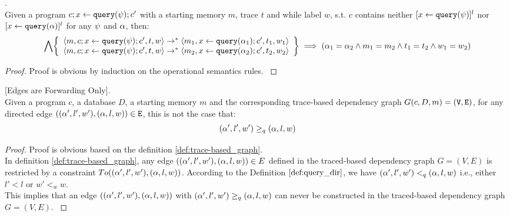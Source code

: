 \documentclass[a4paper,11pt]{article}
\begin{document}
%
%
\begin{lem}
.
\label{lem:querysemidetrm}
\\
{
Given a program $c; \mathrel{ x \leftarrow {\tt query}(\psi) }; c'$ with a starting memory $m$, trace $t$ and while label $w$, 
s.t. $c$ contains neither  
$[\mathrel{ x \leftarrow {\tt query}(\psi) }]^l$ nor $[\mathrel{ x \leftarrow {\tt query}(\alpha) }]^l$ for any $\psi$ and $\alpha$, then:
%
\[
\bigwedge
\left\{
\begin{array}{l}
\config{m, c; \assign{x}{\query(\qexpr)}; c', t, w} 
\rightarrow^{*} 
\config{m_1, \assign{x}{\query(\qval_1)}; c', t_1, w_1} 
\\
\config{m, c; \assign{x}{\query(\qexpr)}; c', t, w} 
\rightarrow^{*} 
\config{m_2, \assign{x}{\query(\qval_2)}; c', t_2, w_2} 
\end{array}
\right\}
\implies
(\qval_1 = \qval_2 \land m_1 = m_2 \land t_1 = t_2 \land w_1 = w_2)
\]
}
\end{lem}
%
\begin{proof}
{
Proof is obvious by induction on the operational semantics rules.
}
\end{proof}
%
\begin{lem}
\label{lem:edgeforwarding}
{[Edges are Forwarding Only]}.
\\
%
{
Given a program $c$, a database $D$, a starting memory $m$ and the corresponding trace-based dependency graph $G(c,D,m) = (\mathtt{V}, \mathtt{E})$, 
for any directed edge $(({\alpha}',l',w'),({\alpha},l,w)) \in \mathtt{E}$, 
this is not the case that:
%
$$({\alpha}',l',w') \geq_{q} ({\alpha},l,w)$$
%
}
\end{lem}
%
\begin{proof}
{
Proof is obvious based on the definition \ref{def:trace-based_graph}.
}
\\
{
In definition \ref{def:trace-based_graph},
any edge $(({\alpha}',l',w'),({\alpha},l,w)) \in E$ defined in the traced-based dependency graph $G = (V,E)$ is restricted by
a constraint
$To(({\alpha}',l',w'),({\alpha},l,w))$.
According to the Definition $\ref{def:query_dir}$, 
we have $({\alpha}',l',w') <_{q} ({\alpha},l,w)$ 
i.e., either $l' < l$ or $w' <_{w} w$.
}
\\
{
This implies that an edge $(({\alpha}',l',w'),({\alpha},l,w))$ 
with $({\alpha}',l',w') \geq_{q} ({\alpha},l,w)$ can never be constructed in the traced-based dependency graph $G = (V,E)$.
}
\end{proof}
\end{document}
